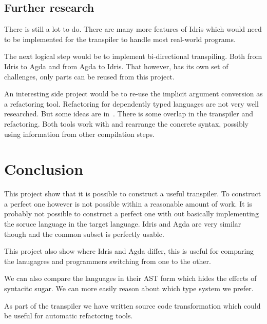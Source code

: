 \subsection{Further research}
There is still a lot to do. There are many more features of Idris which would
need to be implemented for the transpiler to handle most real-world programs.

The next logical step would be to implement bi-directional transpiling. Both
from Idris to Agda and from Agda to Idris. That however, has its own set of
challenges, only parts can be reused from this project.

An interesting side project would be to re-use the implicit argument conversion
as a refactoring tool. Refactoring for dependently typed languages are not very
well researched. But some ideas are in~\cite{wibergh2019}. There is some
overlap in the transpiler and refactoring. Both tools work with and rearrange
the concrete syntax, possibly using information from other compilation steps.


\section{Conclusion}

This project show that it is possible to construct
a useful transpiler. To construct a perfect one however is not possible within
a reasonable amount of work. It is probably not possible to construct a perfect
one with out basically implementing the soruce language in the target language.
Idris and Agda are very similar though and the common subset is perfectly
usable.

This project also show where Idris and Agda differ, this is useful for
comparing the lanugagres and programmers switching from one to the other.

We can also compare the languages in their AST form which hides the effects of
syntacitc sugar. We can more easily reason about which type system we prefer.

As part of the transpiler we have written source code transformation which
could be useful for automatic refactoring tools.



